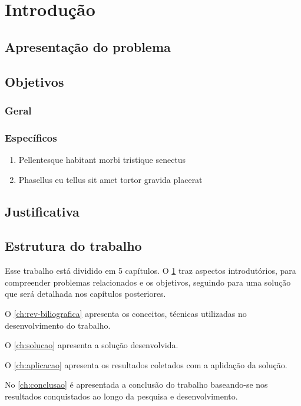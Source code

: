 \chapter{Introdução} \label{ch:introducao}

\lipsum[1]

\lipsum[2]

\lipsum[3]

\section{Apresentação do problema}

\lipsum[1]

\section{Objetivos} \label{sec:obj}

\lipsum[1]

\subsection{Geral} \label{subsec:obj-general}

\lipsum[1]

\subsection{Específicos} \label{subsec:obj-spec}

\begin{enumerate}
  \item Pellentesque habitant morbi tristique senectus
  \item Phasellus eu tellus sit amet tortor gravida placerat
\end{enumerate}

\section{Justificativa}

\lipsum[1]

\section{Estrutura do trabalho}

Esse trabalho está dividido em 5 capítulos. O \cref{ch:introducao} traz
aspectos introdutórios, para compreender problemas relacionados e os objetivos, seguindo para uma solução que será detalhada nos capítulos posteriores.

O \cref{ch:rev-biliografica} apresenta os conceitos, técnicas utilizadas no desenvolvimento do trabalho.

O \cref{ch:solucao} apresenta a solução desenvolvida.

O \cref{ch:aplicacao} apresenta os resultados coletados com a aplidação da solução.

No \cref{ch:conclusao} é apresentada a conclusão do trabalho baseando-se nos resultados conquistados ao longo da pesquisa e desenvolvimento.


